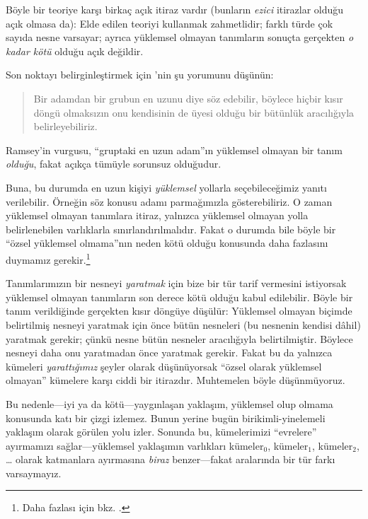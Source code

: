 Böyle bir teoriye karşı birkaç açık itiraz vardır (bunların \emph{ezici}
itirazlar olduğu açık olmasa da): Elde edilen teoriyi kullanmak zahmetlidir;
farklı türde çok sayıda nesne varsayar; ayrıca yüklemsel olmayan tanımların
sonuçta gerçekten \emph{o kadar kötü} olduğu açık değildir.

Son noktayı belirginleştirmek için \citeauthor{Ramsey1925}'nin şu
yorumunu düşünün:
\begin{quote}
  Bir adamdan bir grubun en uzunu diye söz edebilir, böylece hiçbir kısır
  döngü olmaksızın onu kendisinin de üyesi olduğu bir bütünlük aracılığıyla
  belirleyebiliriz. \citep{Ramsey1925}
\end{quote}
Ramsey'in vurgusu, ``gruptaki en uzun adam''ın yüklemsel olmayan bir tanım
\emph{olduğu}, fakat açıkça tümüyle sorunsuz olduğudur.

Buna, bu durumda en uzun kişiyi \emph{yüklemsel} yollarla seçebileceğimiz
yanıtı verilebilir. Örneğin söz konusu adamı parmağımızla gösterebiliriz.
O zaman yüklemsel olmayan tanımlara itiraz, yalnızca yüklemsel olmayan yolla
belirlenebilen varlıklarla sınırlandırılmalıdır. Fakat o durumda bile böyle
bir ``özsel yüklemsel olmama''nın neden kötü olduğu konusunda daha fazlasını
duymamız gerekir.\footnote{Daha fazlası için bkz. \citet{Linnebo2010}.}

Tanımlarımızın bir nesneyi \emph{yaratmak} için bize bir tür tarif vermesini
istiyorsak yüklemsel olmayan tanımların son derece kötü olduğu kabul
edilebilir. Böyle bir tanım verildiğinde gerçekten kısır döngüye düşülür:
Yüklemsel olmayan biçimde belirtilmiş nesneyi yaratmak için önce bütün
nesneleri (bu nesnenin kendisi dâhil) yaratmak gerekir; çünkü nesne bütün
nesneler aracılığıyla belirtilmiştir. Böylece nesneyi daha onu yaratmadan
önce yaratmak gerekir. Fakat bu da yalnızca kümeleri \emph{yarattığımız}
şeyler olarak düşünüyorsak ``özsel olarak yüklemsel olmayan'' kümelere karşı
ciddi bir itirazdır. Muhtemelen böyle düşünmüyoruz.

Bu nedenle---iyi ya da kötü---yaygınlaşan yaklaşım, yüklemsel olup olmama
konusunda katı bir çizgi izlemez. Bunun yerine bugün birikimli-yinelemeli
yaklaşım olarak görülen yolu izler. Sonunda bu, kümelerimizi ``evrelere''
ayırmamızı sağlar---yüklemsel yaklaşımın varlıkları kümeler$_0$,
kümeler$_1$, kümeler$_2$, \ldots{} olarak katmanlara ayırmasına \emph{biraz}
benzer---fakat aralarında bir tür farkı varsaymayız.

